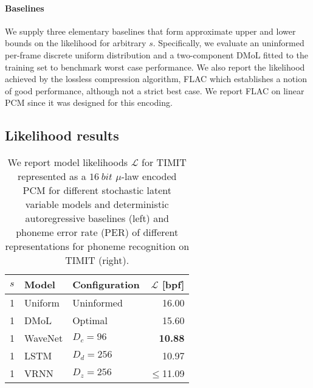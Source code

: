 {\paragraph{Baselines} We supply three elementary baselines that form approximate upper and lower bounds on the likelihood for arbitrary $s$. Specifically, we evaluate an uninformed per-frame discrete uniform distribution and a two-component DMoL fitted to the training set to benchmark worst case performance. 
We also report the likelihood achieved by the lossless compression algorithm, FLAC \parencite{coalson_free_2019} which establishes a notion of good performance, although not a strict best case. We report FLAC on linear PCM since it was designed for this encoding.

\subsection{Likelihood results}
%
\begin{table}
    \caption[Model likelihoods and phoneme error rate for TIMIT.]{ We report model likelihoods $\mathcal{L}$ for TIMIT represented as a $\SI{16}{bit}$ $\mu$-law encoded PCM for different stochastic latent variable models and deterministic autoregressive baselines (left) and phoneme error rate (PER) of different representations for phoneme recognition on TIMIT (right).}
    \hfill
    \begin{subtable}[t]{.485\textwidth}
    \centering
    \begin{adjustbox}{center, totalheight=0.37\paperheight}
    \begin{tabular}[t]{lll|r}
        \toprule
        $s$ & \bfseries Model         & \bfseries Configuration           & \bfseries $\mathcal{L}$ [bpf] \\
        \midrule
        1 & Uniform             & Uninformed                  & 16.00 \\
        1 & DMoL                & Optimal                     & 15.60 \\   %
        \midrule
        1 & WaveNet             & $D_c=96$                    & \textbf{10.88} \\  %
        1 & LSTM                & $D_d=256$                   & 10.97 \\  %
        1 & VRNN                & $D_z=256$                   & $\leq$11.09 \\  %

\end{tabular}
\end{adjustbox}
\end{subtable}
\end{table}}
